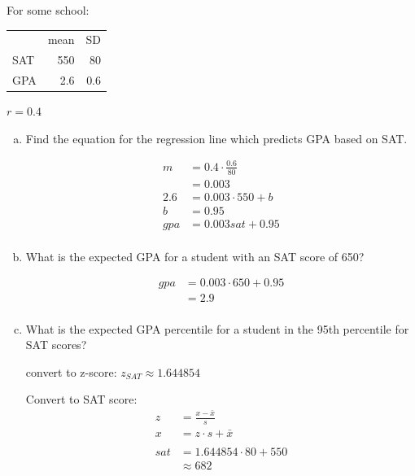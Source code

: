 \documentclass[letterpaper, landscape]{exam}
\begin{document}
  For some school:
  \begin{tabular}[H]{lrr}
         & mean & SD \\
    SAT  & 550  & 80 \\
    GPA  & 2.6  & 0.6 \\
  \end{tabular}

  $r = 0.4$

  \begin{enumerate}[(a)]
    \item Find the equation for the regression line which predicts GPA based on SAT.\@

      \begin{solution}
        \begin{align*}
          m   & = 0.4 \cdot \frac{0.6}{80} \\
              & = 0.003 \\
          2.6 & = 0.003 \cdot 550 + b \\
          b   & = 0.95 \\
          gpa & = 0.003 sat + 0.95 \\
        \end{align*}
      \end{solution}

    \item
      What is the expected GPA for a student with an SAT score of 650?

      \begin{solution}
        \begin{align*}
          gpa & = 0.003 \cdot 650 + 0.95 \\
              & = 2.9 \\
        \end{align*}
      \end{solution}

    \item
      What is the expected GPA percentile for a student in the 95th
      percentile for SAT scores?

      \begin{solution}
        convert to z-score: $z_{SAT} \approx 1.644854$

        Convert to SAT score:
        \begin{align*}
          z   & = \frac{x - \bar{x}}{s} \\
          x   & = z \cdot s + \bar x \\
          \\
          sat & = 1.644854 \cdot 80 + 550 \\
              & \approx 682 \\
        \end{align*}


\end{solution}
\end{enumerate}
\end{document}

